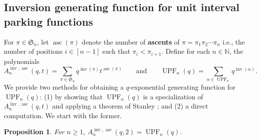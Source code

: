 \documentclass{amsart}
\newcommand{\N}{\mathbb{N}}
\renewcommand{\S}{\mathfrak{S}}
\DeclareMathOperator{\asc}{asc}
\DeclareMathOperator{\inv}{inv}
\DeclareMathOperator{\UPF}{UPF} %
\newcommand{\defterm}{\textbf}
\newtheorem{proposition}[theorem]{Proposition}
\theoremstyle{definition}
\begin{document}
\subsection{Inversion generating function for unit interval parking functions}\label{subsec:inv gen fuct  for UPF}
For $\pi\in \S_n$, let $\asc(\pi)$ denote the number of \defterm{ascents} of $\pi=\pi_1\pi_2\cdots\pi_n$ i.e., the number of positions $i\in [n-1]$ such that $\pi_i<\pi_{i+1}$. 
Define for each $n\in \N$, the polynomials
\begin{equation}
        A_n^{\inv,\asc}(q,t)=\sum_{\pi \in \S_n} q^{\inv(\pi)}t^{\asc(\pi)}\qquad \mbox{and}\qquad
        \UPF_n(q)= \sum_{\alpha \in \UPF_n} q^{\inv(\alpha)}.
\end{equation}
We provide two methods for obtaining a $q$-exponential generating function for $\UPF_n(q)$: (1) by showing that $\UPF_n(q)$ is a specialization of $A_n^{\inv,\asc}(q,t)$ and applying a theorem of Stanley \cite{stanley1976binomial}; and (2) a direct computation. We start with the former.
\begin{proposition}\label{Theorem: inv from Sn}
     For $n\geq 1$,  $A_n^{\inv,\asc}(q,2)=\UPF_n(q)$.
\end{proposition}
\end{document}
